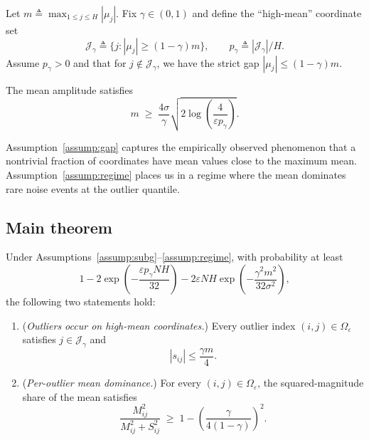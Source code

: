 \begin{assumption}
\label{assump:gap}
Let $m \triangleq \max_{1\le j\le H} |\mu_j|$.
Fix $\gamma\in(0,1)$ and define the ``high-mean'' coordinate set
\[
\mathcal{J}_\gamma \triangleq \{j: |\mu_j|\ge (1-\gamma)m\},
\qquad
p_\gamma \triangleq |\mathcal{J}_\gamma|/H.
\]
Assume $p_\gamma>0$ and that for $j\notin\mathcal{J}_\gamma$, we have the strict gap
$|\mu_j|\le (1-\gamma)m$.
\end{assumption}

\begin{assumption}
\label{assump:regime}
The mean amplitude satisfies
\[
m \;\ge\; \frac{4\sigma}{\gamma}\sqrt{2\log\!\left(\frac{4}{\varepsilon p_\gamma}\right)}.
\]
\end{assumption}

Assumption~\ref{assump:gap} captures the empirically observed phenomenon that a
nontrivial fraction of coordinates have mean values close to the maximum mean.
Assumption~\ref{assump:regime} places us in a regime where the mean dominates
rare noise events at the outlier quantile.

\subsection{Main theorem}

\begin{theorem}
\label{thm:mean_dominates_outliers}
Under Assumptions~\ref{assump:subg}--\ref{assump:regime}, with probability at least
\[
1 - 2\exp\!\left(-\frac{\varepsilon p_\gamma NH}{32}\right) - 2\varepsilon NH \exp\!\left(-\frac{\gamma^2 m^2}{32\sigma^2}\right),
\]
the following two statements hold:

\begin{enumerate}
\item (\emph{Outliers occur on high-mean coordinates.})
Every outlier index $(i,j)\in \Omega_\varepsilon$ satisfies $j\in \mathcal{J}_\gamma$
and
\[
|s_{ij}| \le \frac{\gamma m}{4}.
\]

\item (\emph{Per-outlier mean dominance.})
For every $(i,j)\in \Omega_\varepsilon$,
the squared-magnitude share of the mean satisfies
\[
\frac{M_{ij}^2}{M_{ij}^2 + S_{ij}^2}
\;\ge\;
1 - \left(\frac{\gamma}{4(1-\gamma)}\right)^2.
\]
\end{enumerate}
\end{theorem}

